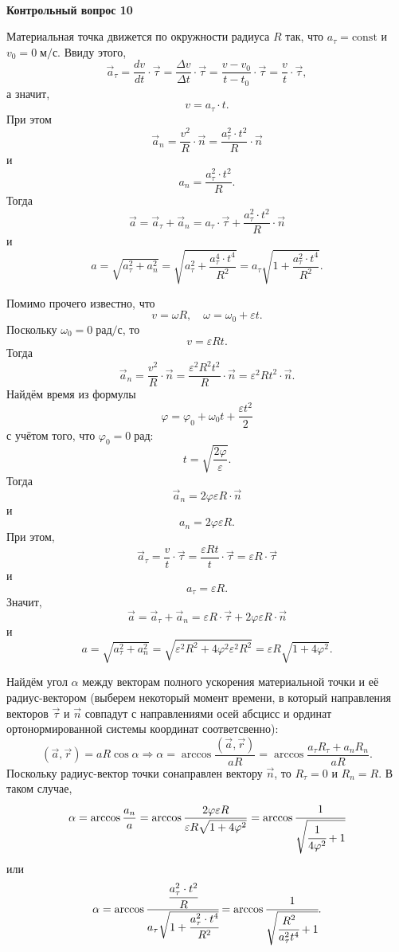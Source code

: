 \\
\begin{center}
	\textbf{\large{Контрольный вопрос 10}}
\end{center}

Материальная точка движется по окружности радиуса $R$ так, что $a_\tau=\text{const}$ и $v_0=0\;\text{м/с}$. Ввиду этого,
\[
\vec a_\tau=\frac{dv}{dt}\cdot\vec\tau=\frac{\Delta v}{\Delta t}\cdot\vec\tau=\frac{v-v_0}{t-t_0}\cdot\vec\tau=\frac{v}{t}\cdot\vec\tau,
\]
а значит,
\[
v=a_\tau\cdot t.
\]
При этом
\[
\vec a_n=\frac{v^2}{R}\cdot\vec n=\frac{a_\tau^2\cdot t^2}{R}\cdot\vec n
\]
и
\[
a_n=\frac{a_\tau^2\cdot t^2}{R}.
\]
Тогда
\[
\vec a=\vec a_\tau+\vec a_n=a_\tau\cdot\vec\tau+\frac{a_\tau^2\cdot t^2}{R}\cdot\vec n
\]
и
\[
a=\sqrt{a_\tau^2+a_n^2}=\sqrt{a_\tau^2+\frac{a_\tau^4\cdot t^4}{R^2}}=a_\tau\sqrt{1+\frac{a_\tau^2\cdot t^4}{R^2}}.
\]

Помимо прочего известно, что
\[
v=\omega R,\quad\omega=\omega_0+\varepsilon t.
\]
Поскольку $\omega_0=0\;\text{рад/с}$, то
\[
v=\varepsilon Rt.
\]
Тогда
\[
\vec a_n=\frac{v^2}{R}\cdot\vec n=\frac{\varepsilon^2 R^2t^2}{R}\cdot\vec n=\varepsilon^2Rt^2\cdot\vec n.
\]
Найдём время из формулы
\[
\varphi=\varphi_0+\omega_0t+\frac{\varepsilon t^2}{2}
\]
с учётом того, что $\varphi_0=0\;\text{рад}$:
\[
t=\sqrt{\frac{2\varphi}{\varepsilon}}.
\]
Тогда
\[
\vec a_n=2\varphi\varepsilon R\cdot\vec n
\]
и
\[
a_n=2\varphi\varepsilon R.
\]
При этом,
\[
\vec a_\tau=\frac{v}{t}\cdot\vec\tau=\frac{\varepsilon Rt}{t}\cdot\vec\tau=\varepsilon R\cdot\vec\tau
\]
и
\[
a_\tau=\varepsilon R.
\]
Значит,
\[
\vec a=\vec a_\tau+\vec a_n=\varepsilon R\cdot\vec\tau+2\varphi\varepsilon R\cdot\vec n
\]
и
\[
a=\sqrt{a_\tau^2+a_n^2}=\sqrt{\varepsilon^2 R^2+4\varphi^2\varepsilon^2R^2}=\varepsilon R\sqrt{1+4\varphi^2}.
\]

Найдём угол $\alpha$ между векторам полного ускорения материальной точки и её радиус-вектором (выберем некоторый момент времени, в который направления векторов $\vec\tau$ и $\vec n$ совпадут с направлениями осей абсцисс и ординат ортонормированной системы координат соответсвенно):
\[
(\vec a,\vec r)=aR\cos\alpha\Rightarrow\alpha=\arccos\frac{(\vec a,\vec r)}{aR}=\arccos\frac{a_\tau R_\tau+a_nR_n}{aR}.
\]
Поскольку радиус-вектор точки сонаправлен вектору $\vec n$, то $R_\tau=0$ и $R_n=R$. В таком случае,
\[
\alpha=\arccos\frac{a_n}{a}=\arccos\frac{2\varphi\varepsilon R}{\varepsilon R\sqrt{1+4\varphi^2}}=\arccos\cfrac{1}{\sqrt{\cfrac{1}{4\varphi^2}+1}}
\]
или
\[
\alpha=\arccos\cfrac{\cfrac{a_\tau^2\cdot t^2}{R}}{a_\tau\sqrt{1+\cfrac{a_\tau^2\cdot t^4}{R^2}}}=\arccos\cfrac{1}{\sqrt{\cfrac{R^2}{a_\tau^2t^4}+1}}.
\]